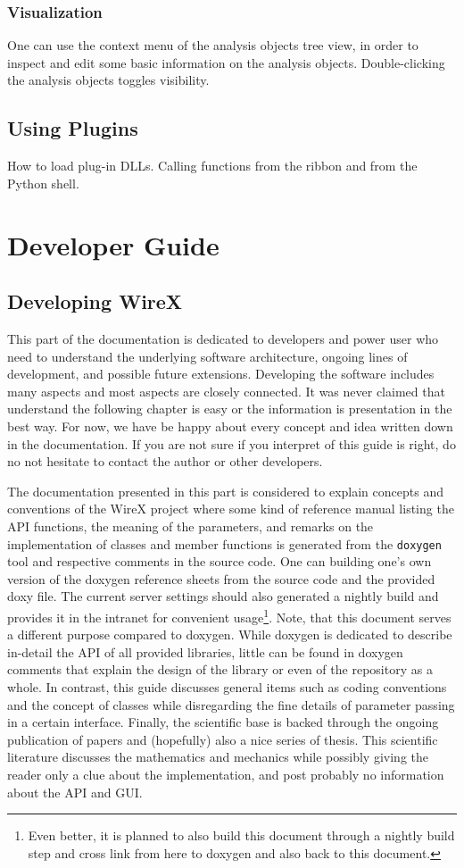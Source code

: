 \documentclass[11pt,a4paper,onepage,openany]{book}
\begin{document}
\section{Visualization}
One can use the context menu of the analysis objects tree view, in order to
inspect and edit some basic information on the analysis objects.
Double-clicking the analysis objects toggles visibility.

\chapter{Using Plugins}\label{sec:Plugins}%
How to load plug-in DLLs. Calling functions from the ribbon and from the Python
shell.

\part{Developer Guide}
\chapter{Developing WireX}
This part of the documentation is dedicated to developers and power user who
need to understand the underlying software architecture, ongoing lines of
development, and possible future extensions. Developing the software includes
many aspects and most aspects are closely connected. It was never claimed that
understand the following chapter is easy or the information is presentation in
the best way. For now, we have be happy about every concept and idea written
down in the documentation. If you are not sure if you interpret of this guide
is right, do no not hesitate to contact the author or other developers.

The documentation presented in this part is considered to explain concepts and
conventions of the WireX project where some kind of reference manual listing
the API functions, the meaning of the parameters, and remarks on the
implementation of classes and member functions is generated from the
\texttt{doxygen} tool and respective comments in the source code. One can
building one's own version of the doxygen reference sheets from the source code
and the provided doxy file. The current server settings should also generated a
nightly build and provides it in the intranet for convenient
usage\footnote{Even better, it is planned to also build this document through a
nightly build step and cross link from here to doxygen and also back to this
document.}. Note, that this document serves a different purpose compared to
doxygen.  While doxygen is dedicated to describe in-detail the API of all
provided libraries, little can be found in doxygen comments that explain the
design of the library or even of the repository as a whole. In contrast, this
guide discusses general items such as coding conventions and the concept of
classes while disregarding the fine details of parameter passing in a certain
interface. Finally, the scientific base is backed through the ongoing
publication of papers and (hopefully) also a nice series of thesis. This
scientific literature discusses the mathematics and mechanics while possibly
giving the reader only a clue about the implementation, and post probably no
information about the API and GUI.
\end{document}
